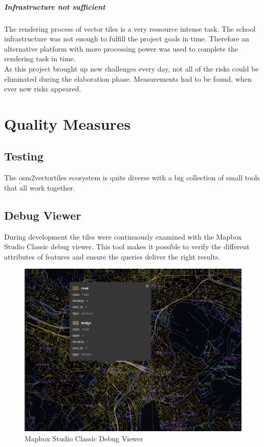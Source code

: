 \paragraph{Infrastructure not sufficient} The rendering process of vector tiles is a very ressource intense task. The school infrastructure was not enough to fulfill the project goals in time. Therefore an alternative platform with more processing power was used to complete the rendering task in time.\\

As this project brought up new challenges every day, not all of the risks could be eliminated during the elaboration phase. Measurements had to be found, when ever new risks appeared.

\newpage
\chapter{Quality Measures}\label{quality-measures}

\section{Testing}\label{testing}

The osm2vectortiles ecosystem is quite diverse with a big collection of small tools that all work together.

\section{Debug Viewer}

During development the tiles were continuously examined with the Mapbox Studio Classic debug viewer.
This tool makes it possible to verify the different attributes of features and ensure the queries deliver the right results.

\begin{figure}[H]
\centering
  \includegraphics[width=1\textwidth]{images/mapbox_studio_debug_viewer.png}
  \caption{Mapbox Studio Classic Debug Viewer}
\end{figure}

